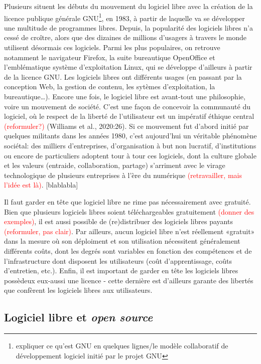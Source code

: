 \documentclass[
  letterpaper,
  DIV=11,
  numbers=noendperiod]{scrreprt}
\begin{document}
Plusieurs situent les débuts du mouvement du logiciel libre avec la
création de la licence publique générale GNU\footnote{expliquer ce
  qu'est GNU en quelques lignes/le modèle collaboratif de développement
  logiciel initié par le projet GNU}, en 1983, à partir de laquelle va
se développer une multitude de programmes libres. Depuis, la popularité
des logiciels libres n'a cessé de croître, alors que des dizaines de
millions d'usagers à travers le monde utilisent désormais ces logiciels.
Parmi les plus populaires, on retrouve notamment le navigateur Firefox,
la suite bureautique OpenOffice et l'emblématique système d'exploitation
Linux, qui se développe d'ailleurs à partir de la licence GNU. Les
logiciels libres ont différents usages (en passant par la conception
Web, la gestion de contenu, les sytèmes d'exploitation, la
bureautique\ldots). Encore une fois, le logiciel libre est avant-tout
une philosophie, voire un mouvement de société. C'est une façon de
concevoir la communauté du logiciel, où le respect de la liberté de
l'utilisateur est un impératif éthique central
\textcolor{red}{(reformuler?)} (Williams et al., 2020:26). Si ce
mouvement fut d'abord initié par quelques militants dans les années
1980, c'est aujourd'hui un véritable phénomène sociétal: des milliers
d'entreprises, d'organisation à but non lucratif, d'institutions ou
encore de particuliers adoptent tour à tour ces logiciels, dont la
culture globale et les valeurs (entraide, collaboration, partage)
s'arriment avec le virage technologique de plusieurs entreprises à l'ère
du numérique \textcolor{red}{(retravailler, mais l'idée est là)}.
{[}blablabla{]}

Il faut garder en tête que logiciel libre ne rime pas nécessairement
avec gratuité. Bien que plusieurs logiciels libres soient
téléchargeables gratuitement \textcolor{red}{(donner des exemples)}, il
est aussi possible de (re)distribuer des logiciels libres payants
\textcolor{red}{(reformuler, pas clair)}. Par ailleurs, aucun logiciel
libre n'est réellement «gratuit» dans la mesure où son déploiment et son
utilisation nécessitent généralement différents coûts, dont les degrés
sont variables en fonction des compétences et de l'infrastructure dont
disposent les utilisateurs (coût d'apprentissage, coûts d'entretien,
etc.). Enfin, il est important de garder en tête les logiciels libres
possèdeux eux-aussi une licence - cette dernière est d'ailleurs garante
des libertés que confèrent les logiciels libres aux utilisateurs.

\hypertarget{logiciel-libre-et-open-source}{%
\subsection{\texorpdfstring{Logiciel libre et \emph{open
source}}{Logiciel libre et open source}}\label{logiciel-libre-et-open-source}}
\end{document}
